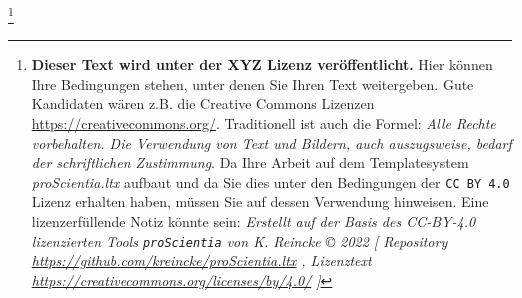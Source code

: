 
\footnote{\textbf{Dieser Text wird unter der XYZ Lizenz veröffentlicht.}
Hier können Ihre Bedingungen stehen, unter denen Sie Ihren Text weitergeben.
Gute Kandidaten wären z.B. die Creative Commons Lizenzen
\href{https://creativecommons.org/}{https://creativecommons.org/}. Traditionell ist auch die Formel: \emph{Alle Rechte vorbehalten. Die Verwendung von Text und Bildern, auch auszugsweise, bedarf der schriftlichen Zustimmung}. \newline
Da Ihre Arbeit auf dem Templatesystem \textit{proScientia.ltx} aufbaut und da Sie dies unter den Bedingungen der \texttt{CC BY 4.0} Lizenz erhalten haben, müssen Sie auf dessen Verwendung hinweisen. Eine lizenzerfüllende Notiz könnte sein:
\newline
\textit{Erstellt auf der Basis des CC-BY-4.0 lizenzierten Tools \texttt{proScientia} von K. Reincke \copyright{} 2022 [
Repository \href{https://github.com/kreincke/proScientia.ltx}{https://github.com/kreincke/proScientia.ltx} ,
Lizenztext \href{https://creativecommons.org/licenses/by/4.0/}{https://creativecommons.org/licenses/by/4.0/} ]
}}
